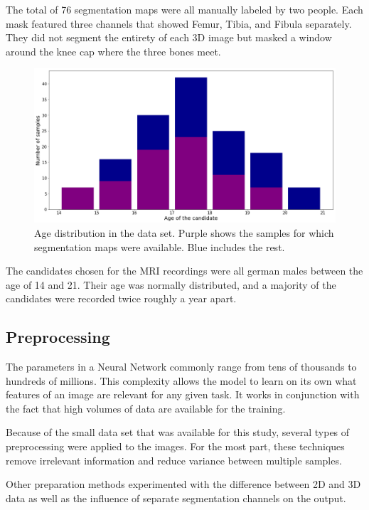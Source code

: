 The total of 76 segmentation maps were all manually labeled by two people. Each mask featured three channels that showed Femur, Tibia, and Fibula separately. They did not segment the entirety of each 3D image but masked a window around the knee cap where the three bones meet.

\begin{figure}[H]
\centering
\par
\includegraphics[width=1.0\textwidth]{imgs/age_distr.png}
\caption{Age distribution in the data set. Purple shows the samples for which segmentation maps were available. Blue includes the rest.}
\par
\end{figure}

The candidates chosen for the MRI recordings were all german males between the age of 14 and 21. Their age was normally distributed, and a majority of the candidates were recorded twice roughly a year apart.

\subsection{Preprocessing}

The parameters in a Neural Network commonly range from tens of thousands to hundreds of millions. This complexity allows the model to learn on its own what features of an image are relevant for any given task. It works in conjunction with the fact that high volumes of data are available for the training.

Because of the small data set that was available for this study, several types of preprocessing were applied to the images. For the most part, these techniques remove irrelevant information and reduce variance between multiple samples.

Other preparation methods experimented with the difference between 2D and 3D data as well as the influence of separate segmentation channels on the output.

